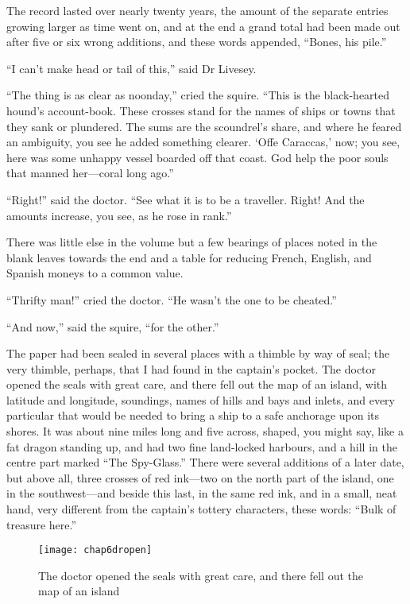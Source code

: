The record lasted over nearly twenty years, the amount of the separate entries growing larger as time went on, and at the end a grand total had been made out after five or six wrong additions, and these words appended, \enquote{Bones, his pile.}

\enquote{I can’t make head or tail of this,} said Dr Livesey.

\enquote{The thing is as clear as noonday,} cried the squire. \enquote{This is the black-hearted hound’s account-book. These crosses stand for the names of ships or towns that they sank or plundered. The sums are the scoundrel’s share, and where he feared an ambiguity, you see he added something clearer. \enquote{Offe Caraccas,} now; you see, here was some unhappy vessel boarded off that coast. God help the poor souls that manned her---coral long ago.}

\enquote{Right!} said the doctor. \enquote{See what it is to be a traveller. Right! And the amounts increase, you see, as he rose in rank.}

There was little else in the volume but a few bearings of places noted in the blank leaves towards the end and a table for reducing French, English, and Spanish moneys to a common value.

\enquote{Thrifty man!} cried the doctor. \enquote{He wasn’t the one to be cheated.}

\enquote{And now,} said the squire, \enquote{for the other.}

 
The paper had been sealed in several places with a thimble by way of seal; the very thimble, perhaps, that I had found in the captain’s pocket. The doctor opened the seals with great care, and there fell out the map of an island, with latitude and longitude, soundings, names of hills and bays and inlets, and every particular that would be needed to bring a ship to a safe anchorage upon its shores. It was about nine miles long and five across, shaped, you might say, like a fat dragon standing up, and had two fine land-locked harbours, and a hill in the centre part marked \enquote{The Spy-Glass.} There were several additions of a later date, but above all, three crosses of red ink---two on the north part of the island, one in the southwest---and beside this last, in the same red ink, and in a small, neat hand, very different from the captain’s tottery characters, these words: \enquote{Bulk of treasure here.}


\begin{figure}[p]
\centering
\texttt{[image: chap6dropen]}
\caption[There fell out the map of an island]{The doctor opened the seals with great care, and there fell out the map of an island}
\end{figure}

